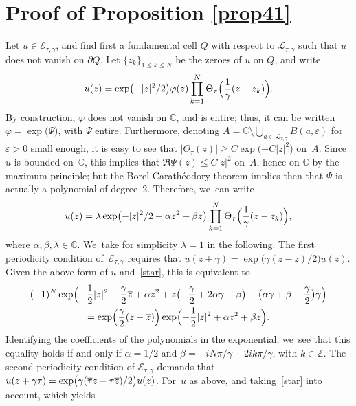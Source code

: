 \documentclass[10pt]{amsart}
\theoremstyle{definition}
\let\eps\varepsilon
\let\EE\exp
\let\dis\relax
\let\ov\overline
\newcommand{\bpa}[1]{\bigl(#1\bigr)}
\begin{document}
\section{Proof of Proposition \ref{prop41}}

\label{App1}
Let $u \in \mathcal{E}_{\tau,\gamma}$, and find first a fundamental cell $Q$ with respect to $\mathcal{L}_{\tau, \gamma}$ such that $u$ does not vanish on $\partial Q$. Let $\{ z_k \}_{1\leq k\leq N}$ be the zeroes of $u$ on $Q$, and write\vspace*{-3pt}
\[
\dis u(z) = \EE\bigl(-|z|^2/2 \bigr) \varphi(z) \prod_{k=1}^N \Theta_{\tau}\Bigl(\frac{1}{\gamma}(z-z_{k})\Bigr).
\]
By construction, $\varphi$ does not vanish on $\mathbb{C}$, and is entire; thus, it can be written $\varphi = \EE\bigl(\Psi\bigr)$, with $\Psi$ entire. Furthermore, denoting $A = \mathbb{C} \setminus \bigcup_{a \in \mathcal{L}_{\tau,\gamma}} B(a,\eps)$ for $\eps>0$ small enough, it is easy to see that $|\Theta_\tau(z)| \geq C \EE\bigl({-C|z|^2}\bigr)$ on~$A$. Since $u$ is bounded on~$\mathbb{C}$, this implies that $\Re \Psi (z) \leq C |z|^2$ on~$A$, hence on $\mathbb{C}$ by the maximum principle; but the Borel-Carathéodory theorem implies then that $\Psi$ is actually a polynomial of degree~2. Therefore, we~can write\vspace*{-3pt}
\begin{equation}\label{eqA1}
\dis u(z) = \lambda \EE\bigl({-|z|^2/2 + \alpha z^2 + \beta z}\bigr) \prod_{k=1}^N\Theta_{\tau}\Bigl(\frac{1}{\gamma}(z-z_{k})\Bigr),
\end{equation}
where $\alpha,\beta,\lambda \in \mathbb{C}$. We~take for simplicity $\lambda =1$ in the following. The first periodicity condition of~$\mathcal{E}_{\tau,\gamma}$ requires that $u(z+\gamma) = \EE\bigl({\gamma}(z-\overline{z})/2\bigr) u(z)$. Given the above form of $u$ and~\eqref{star}, this is equivalent to\vspace*{-3pt}
\begin{multline*}
(-1)^N \EE\Bigl(-\frac{1}{2}|z|^2 - \frac{\gamma}{2} \ov{z} + \alpha z^2 + z\bpa{-\frac{\gamma}{2} + 2 \alpha \gamma+ \beta} + \bpa{\alpha \gamma+ \beta - \frac{\gamma}{2}}\gamma \Bigr) \\
= \EE\Bigl(\frac{\gamma}{2}(z-\ov{z})\Bigr) \EE\Bigl({-\frac{1}{2}|z|^2+\alpha z^2 + \beta z}\Bigr).
\end{multline*}
Identifying the coefficients of the polynomials in the exponential, we~see that this equality holds if and only if $\alpha = 1/2$ and $\beta = -{iN\pi}/{\gamma} + {2ik\pi}/{\gamma}$, with $k \in \mathbb{Z}$. The second periodicity condition of $\mathcal{E}_{\tau,\gamma}$ demands that $\dis u(z+\gamma\tau) = \EE\bigl({{\gamma}(\ov{\tau}z-\tau \ov{z})/2}\bigr)u(z)$. For~$u$ as above, and taking~\eqref{star} into account, which yields\vspace*{-3pt}
\end{document}
